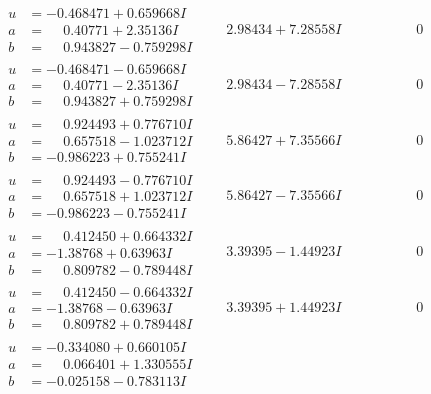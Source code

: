 \documentclass[1p]{elsarticle_modified}
\theoremstyle{definition}
\begin{document}
$$\begin{array}{c|c|c}
\begin{aligned}
u &= -0.468471 + 0.659668 I \\
a &= \phantom{-}0.40771 + 2.35136 I \\
b &= \phantom{-}0.943827 - 0.759298 I\end{aligned}
 & \phantom{-}2.98434 + 7.28558 I & \phantom{-0.000000 } 0 \\ \hline\begin{aligned}
u &= -0.468471 - 0.659668 I \\
a &= \phantom{-}0.40771 - 2.35136 I \\
b &= \phantom{-}0.943827 + 0.759298 I\end{aligned}
 & \phantom{-}2.98434 - 7.28558 I & \phantom{-0.000000 } 0 \\ \hline\begin{aligned}
u &= \phantom{-}0.924493 + 0.776710 I \\
a &= \phantom{-}0.657518 - 1.023712 I \\
b &= -0.986223 + 0.755241 I\end{aligned}
 & \phantom{-}5.86427 + 7.35566 I & \phantom{-0.000000 } 0 \\ \hline\begin{aligned}
u &= \phantom{-}0.924493 - 0.776710 I \\
a &= \phantom{-}0.657518 + 1.023712 I \\
b &= -0.986223 - 0.755241 I\end{aligned}
 & \phantom{-}5.86427 - 7.35566 I & \phantom{-0.000000 } 0 \\ \hline\begin{aligned}
u &= \phantom{-}0.412450 + 0.664332 I \\
a &= -1.38768 + 0.63963 I \\
b &= \phantom{-}0.809782 - 0.789448 I\end{aligned}
 & \phantom{-}3.39395 - 1.44923 I & \phantom{-0.000000 } 0 \\ \hline\begin{aligned}
u &= \phantom{-}0.412450 - 0.664332 I \\
a &= -1.38768 - 0.63963 I \\
b &= \phantom{-}0.809782 + 0.789448 I\end{aligned}
 & \phantom{-}3.39395 + 1.44923 I & \phantom{-0.000000 } 0 \\ \hline\begin{aligned}
u &= -0.334080 + 0.660105 I \\
a &= \phantom{-}0.066401 + 1.330555 I \\
b &= -0.025158 - 0.783113 I\end{aligned}

\end{array}$$
\end{document}
